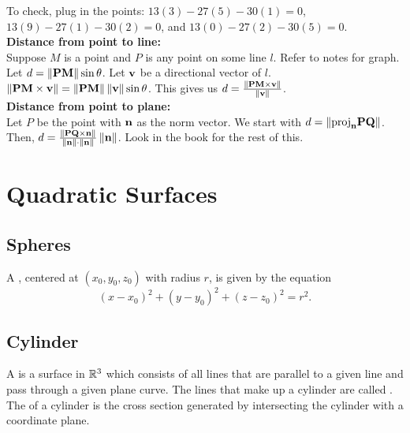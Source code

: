 To check, plug in the points: \(13(3) - 27(5) - 30(1) = 0\), \(13(9) - 27(1) - 30(2) = 0\), and \(13(0) - 27(2) - 30(5) = 0\). \\

\textbf{Distance from point to line:} \\

Suppose \(M\) is a point and \(P\) is any point on some line \(l\). Refer to notes for graph. Let \(d = \left\lVert \mathbf{PM}\right\rVert\sin \theta\). Let \(\mathbf{v}\) be a directional vector of \(l\). \\ 

\(\left\lVert \mathbf{PM \times v}\right\rVert = \left\lVert \mathbf{PM}\right\rVert\left\lVert \mathbf{v}\right\rVert\sin \theta\). This gives us \(d = \frac{\left\lVert \mathbf{PM \times v}\right\rVert}{\left\lVert \mathbf{v}\right\rVert}\). \\

\textbf{Distance from point to plane:} \\

Let \(P\) be the point with \(\mathbf{n}\) as the norm vector. We start with \(d = \left\lVert \mathbf{\text{proj}_{n}PQ}\right\rVert\). Then, \(d = \frac{\left\lVert \mathbf{PQ \times n}\right\rVert}{\left\lVert \mathbf{n}\right\rVert\cdot \left\lVert \mathbf{n}\right\rVert}\left\lVert \mathbf{n}\right\rVert\). Look in the book for the rest of this.




\newpage

\section{Quadratic Surfaces}

\subsection{Spheres}

A , centered at \((x_{0},y_{0},z_{0})\) with radius \(r\), is given by the equation
\[
    (x - x_{0})^{2} + (y - y_{0})^{2} + (z - z_{0})^{2} = r^{2}.
\]

\subsection{Cylinder}

A  is a surface in \(\mathbb{R}^{3}\) which consists of all lines that are parallel to a given line and pass through a given plane curve. The lines that make up a cylinder are called . The  of a cylinder is the cross section generated by intersecting the cylinder with a coordinate plane.

